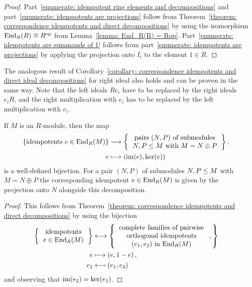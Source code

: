 \begin{proof}
  Part~\ref*{enumerate: idempotent ring elements and decompositions} and part~\ref*{enumerate: idempotents are projections} follow from Theorem~\ref{theorem: correspondence idempotents and direct decompositions} by using the isomorphism $\operatorname{End}_R(R) \cong R^{\operatorname{op}}$ from Lemma~\ref{lemma: End_R(R) = Rop}.
  Part~\ref*{enumerate: idempotents are summands of 1} follows from part~\ref*{enumerate: idempotents are projections} by applying the projection onto $I_i$ to the element $1 \in R$.
\end{proof}


\begin{remark}
  The analogous result of Corollary~\ref{corollary: correspondence idempotents and direct ideal decompositions} for right ideal also holds and can be proven in the same way.
  Note that the left ideals $R e_i$ have to be replaced by the right ideals $e_i R$, and the right multiplication with $e_i$ has to be replaced by the left multiplication with $e_i$.
\end{remark}


\begin{corollary}
  \label{corollary: projections correspond to decompositions}
  If $M$ is an $R$-module, then the map
  \begin{align*}
    \{ \text{idempotents $e \in \End_R(M)$} \}
    &\longto
      \left\{
      \begin{tabular}{c}
        pairs $(N,P)$ of submodules \\
        $N, P \moduleleq M$ with $M = N \oplus P$
      \end{tabular}
      \right\},
    \\
                  e
    &\longmapsto  (\im(e), \ker(e))
  \end{align*}
  is a well-defined bijection.
  For a pair $(N,P)$ of submodules $N, P \leq M$ with $M = N \oplus P$ the corresponding idempotent $e \in \operatorname{End}_R(M)$ is given by the projection onto $N$ alongside this decomposition.
\end{corollary}


\begin{proof}
  This follows from Theorem~\ref{theorem: correspondence idempotents and direct decompositions} by using the bijection
  \begin{align*}
    \left\{
      \begin{tabular}{c}
        idempotents \\
        $e \in \End_R(M)$
      \end{tabular}
    \right\}
    &\longleftrightarrow
    \left\{
      \begin{tabular}{c}
        complete families of pairwise \\
        orthogonal idempotents  \\
        $(e_1, e_2)$ in $\End_R(M)$
      \end{tabular} \,,
    \right\}
    \\
    e
    &\longmapsto
    (e, 1-e) \,,
    \\
    e_1
    &\longmapsfrom
    (e_1, e_2)
  \end{align*}
  and observing that $\operatorname{im}(e_2) = \ker(e_1)$.
\end{proof}


